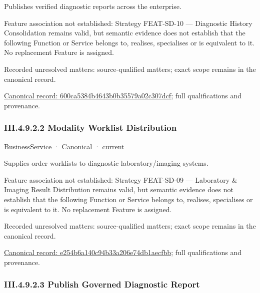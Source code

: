 Publishes verified diagnostic reports across the enterprise.



Feature association not established: Strategy FEAT-SD-10 — Diagnostic History Consolidation remains valid, but semantic evidence does not establish that the following Function or Service belongs to, realises, specialises or is equivalent to it. No replacement Feature is assigned.


{\small Recorded unresolved matters: source-qualified matters; exact scope remains in the canonical record.}\par
{\footnotesize \href{../../../../../../../../continuum/business/business-service/600ca5384b4643b0b35579a02c307dcf.md}{Canonical record: 600ca5384b4643b0b35579a02c307dcf}; full qualifications and provenance.}\par
\subsubsection*{III.4.9.2.2 Modality Worklist Distribution}
\label{navigation:III.4.9.2.2}

\label{element:e254b6a140c94b33a206e74db1aecfbb}
{\small BusinessService · Canonical · current}\par

Supplies order worklists to diagnostic laboratory/imaging systems.



Feature association not established: Strategy FEAT-SD-09 — Laboratory \& Imaging Result Distribution remains valid, but semantic evidence does not establish that the following Function or Service belongs to, realises, specialises or is equivalent to it. No replacement Feature is assigned.


{\small Recorded unresolved matters: source-qualified matters; exact scope remains in the canonical record.}\par
{\footnotesize \href{../../../../../../../../continuum/business/business-service/e254b6a140c94b33a206e74db1aecfbb.md}{Canonical record: e254b6a140c94b33a206e74db1aecfbb}; full qualifications and provenance.}\par
\subsubsection*{III.4.9.2.3 Publish Governed Diagnostic Report}
\label{navigation:III.4.9.2.3}

